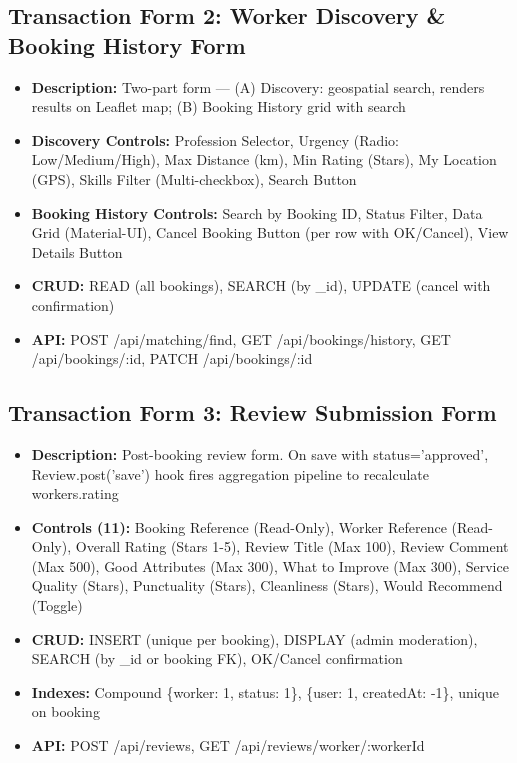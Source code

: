 \documentclass[12pt,a4paper]{article}
\begin{document}
\subsection*{Transaction Form 2: Worker Discovery \& Booking History Form}
\begin{itemize}[leftmargin=*]
    \item \textbf{Description:} Two-part form — (A) Discovery: geospatial search, renders results on Leaflet map; (B) Booking History grid with search
    \item \textbf{Discovery Controls:} Profession Selector, Urgency (Radio: Low/Medium/High), Max Distance (km), Min Rating (Stars), My Location (GPS), Skills Filter (Multi-checkbox), Search Button
    \item \textbf{Booking History Controls:} Search by Booking ID, Status Filter, Data Grid (Material-UI), Cancel Booking Button (per row with OK/Cancel), View Details Button
    \item \textbf{CRUD:} READ (all bookings), SEARCH (by \_id), UPDATE (cancel with confirmation)
    \item \textbf{API:} POST /api/matching/find, GET /api/bookings/history, GET /api/bookings/:id, PATCH /api/bookings/:id
\end{itemize}

\subsection*{Transaction Form 3: Review Submission Form}
\begin{itemize}[leftmargin=*]
    \item \textbf{Description:} Post-booking review form. On save with status='approved', Review.post('save') hook fires aggregation pipeline to recalculate workers.rating
    \item \textbf{Controls (11):} Booking Reference (Read-Only), Worker Reference (Read-Only), Overall Rating (Stars 1-5), Review Title (Max 100), Review Comment (Max 500), Good Attributes (Max 300), What to Improve (Max 300), Service Quality (Stars), Punctuality (Stars), Cleanliness (Stars), Would Recommend (Toggle)
    \item \textbf{CRUD:} INSERT (unique per booking), DISPLAY (admin moderation), SEARCH (by \_id or booking FK), OK/Cancel confirmation
    \item \textbf{Indexes:} Compound \{worker: 1, status: 1\}, \{user: 1, createdAt: -1\}, unique on booking
    \item \textbf{API:} POST /api/reviews, GET /api/reviews/worker/:workerId
\end{itemize}
\end{document}
